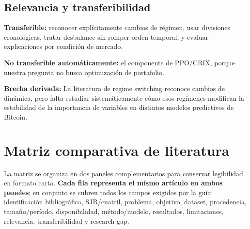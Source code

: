 \documentclass[11pt,letterpaper]{article}
\newcommand{\gapbox}[1]{\par\medskip\noindent\colorbox{gris}{\parbox{0.96\linewidth}{\textbf{Brecha derivada:} #1}}\medskip}
\begin{document}
\subsection{Relevancia y transferibilidad}
\textbf{Transferible:} reconocer explícitamente cambios de régimen, usar divisiones cronológicas, tratar desbalance sin romper orden temporal, y evaluar explicaciones por condición de mercado.

\textbf{No transferible automáticamente:} el componente de PPO/CRIX, porque nuestra pregunta no busca optimización de portafolio.

\gapbox{La literatura de regime switching reconoce cambios de dinámica, pero falta estudiar sistemáticamente cómo esos regímenes modifican la estabilidad de la importancia de variables en distintos modelos predictivos de Bitcoin.}

\section{Matriz comparativa de literatura}

La matriz se organiza en dos paneles complementarios para conservar legibilidad en formato carta. \textbf{Cada fila representa el mismo artículo en ambos paneles}; en conjunto se cubren todos los campos exigidos por la guía: identificación bibliográfica, SJR/cuatril, problema, objetivo, dataset, procedencia, tamaño/período, disponibilidad, método/modelo, resultados, limitaciones, relevancia, transferibilidad y research gap.
\end{document}
